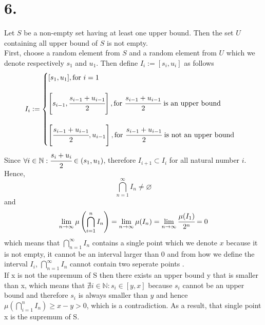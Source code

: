 \documentclass[11pt]{article}
\begin{document}
\pagebreak
\section*{6.}
Let $S$ be a non-empty set having at least one upper bound. Then the set $U$ containing all upper bound of $S$ is not empty. \\
First, choose a random element from $S$ and a random element from $U$ which we denote respectively $s_1$ and $u_1$.
Then define $I_i := [s_i,u_i]$ as follows
\[
I_i:=
\begin{cases}
[s_1, u_1], \text{for } i=1 \\~\\
\left[s_{i-1} , \cfrac{s_{i-1} + u_{i-1}}{2} \right], \text{for } \cfrac{s_{i-1} + u_{i-1}}{2} \text{ is an upper bound}\\~\\
\left[\cfrac{s_{i-1} + u_{i-1}}{2}, u_{i-1} \right], \text{for } \cfrac{s_{i-1} + u_{i-1}}{2} \text{ is not an upper bound}\\
\end{cases}
\]
Since $\forall i \in \mathbb{N}: \cfrac{s_i + u_i}{2} \in (s_1, u_1)$, therefore $I_{i+1} \subset I_i$ for all natural number $i$. Hence,
\[
\bigcap\limits_{n=1}^{\infty}I_n \ne \varnothing
\]
and
\[
\lim_{n \to \infty} \mu\left(\bigcap\limits_{i=1}^n I_n\right) = \lim_{n \to \infty} \mu(I_n) = \lim_{n \to \infty}\cfrac{\mu(I_1)}{2^n} = 0
\]
which means that $\bigcap\limits_{n=1}^{\infty}I_n$ contains a single point which we denote $x$ because it is not empty, it cannot be an interval larger than 0 and from how we define the interval $I_i$, $\bigcap\limits_{n=1}^{\infty}I_n$ cannot contain two seperate points . \\
If x is not the supremum of S then there exists an upper bound y that is smaller than x, which means that $\nexists i \in \mathbb{N}: s_i \in [y,x]$ because $s_i$ cannot be an upper bound and therefore $s_i$ is always smaller than $y$ and hence  $\mu\left(\bigcap\limits_{i=1}^n I_n\right) \ge x-y >0$, which is a contradiction. As a result, that single point x is the supremum of S.
\end{document}
